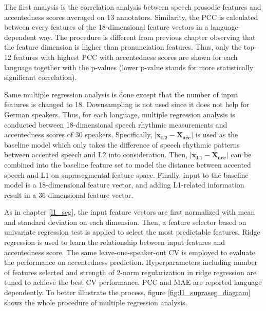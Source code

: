 The first analysis is the correlation analysis between speech prosodic features and accentedness scores averaged on 13 annotators. Similarity, the PCC is calculated between every features of the 18-dimensional feature vectors in a language-dependent way. The procedure is different from previous chapter observing that the feature dimension is higher than pronunciation features. Thus, only the top-12 features with highest PCC with accentedness scores are shown for each language together with the p-values (lower p-value stands for more statistically significant correlation).

Same multiple regression analysis is done except that the number of input features is changed to 18. Downsampling is not used since it does not help for German speakers. Thus, for each language, multiple regression analysis is conducted between 18-dimensional speech rhythmic measurements and accentedness  scores of 30 speakers. Specifically, $\left| \mathbf{x_{L2}}-\mathbf{X_{acc}} \right|$ is used as the baseline model which only takes the difference of speech rhythmic patterns between accented speech and L2 into consideration. Then, $\left| \mathbf{x_{L1}}- \mathbf{X_{acc}} \right|$ can be combined into the baseline feature set to model the distance between accented speech and L1 on suprasegmental feature space. Finally, input to the baseline model is a 18-dimensional feature vector, and adding L1-related information result in a 36-dimensional feature vector.

As in chapter \ref{l1_seg}, the input feature vectors are first normalized with mean and standard deviation on each dimension. Then, a feature selector based on univariate regression test is applied to select the most predictable features. Ridge regression is used to learn the relationship between input features and accentedness score. The same leave-one-speaker-out CV is employed to evaluate the performance on accentedness prediction. Hyperparameters including number of features selected and strength of 2-norm regularization in ridge regression are tuned to achieve the best CV performance. PCC and MAE are reported language dependently. To better illustrate the process, figure \ref{fig:l1_supraseg_diagram} shows the whole procedure of multiple regression analysis.

